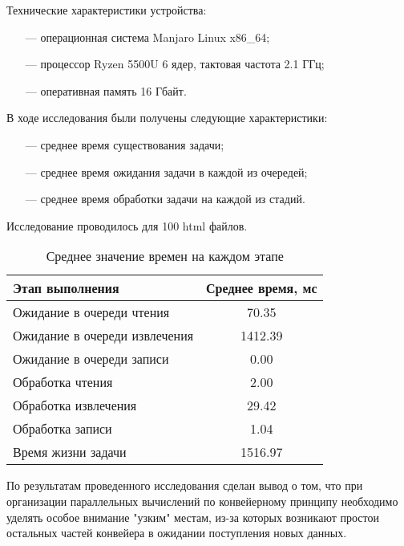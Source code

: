 
Технические характеристики устройства:

\begin{itemize}
	\item[---] операционная система Manjaro Linux x86\_64;
	\item[---] процессор Ryzen 5500U 6 ядер, тактовая частота 2.1 ГГц;
	\item[---] оперативная память 16 Гбайт.
\end{itemize}

В ходе исследования были получены следующие характеристики:

\begin{itemize}
	\item[---] среднее время существования задачи;
	\item[---] среднее время ожидания задачи в каждой из очередей;
	\item[---] среднее время обработки задачи на каждой из стадий.
\end{itemize}

Исследование проводилось для 100 html файлов.

\FloatBarrier
\begin{table}[h!]
	\centering
	\caption{Среднее значение времен на каждом этапе}
	\begin{tabular}{|l|c|}
		\hline Этап выполнения & Среднее время, мс \\\hline
		Ожидание в очереди чтения & 70.35 \\\hline
		Ожидание в очереди извлечения & 1412.39 \\\hline
		Ожидание в очереди записи & 0.00 \\\hline
		Обработка чтения & 2.00 \\\hline
		Обработка извлечения & 29.42 \\\hline
		Обработка записи & 1.04 \\\hline
		Время жизни задачи & 1516.97 \\\hline
	\end{tabular}
	\label{tab:time_spent}
\end{table}
\FloatBarrier

По результатам проведенного исследования сделан вывод о том, что при организации параллельных вычислений по конвейерному принципу необходимо уделять особое внимание "узким" местам, из-за которых возникают простои остальных частей конвейера в ожидании поступления новых данных. 

